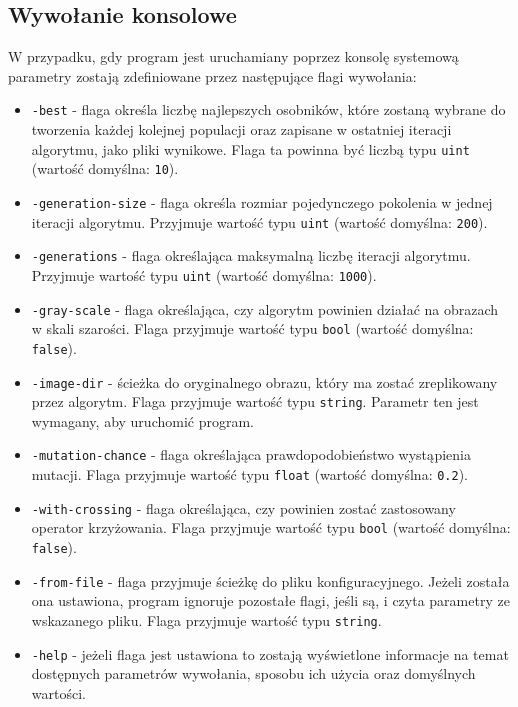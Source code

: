 \subsection{Wywołanie konsolowe}
W przypadku, gdy program jest uruchamiany poprzez konsolę systemową parametry zostają zdefiniowane przez następujące flagi wywołania:
\begin{itemize}
    \item \texttt{-best} - flaga określa liczbę najlepszych osobników, które zostaną wybrane do tworzenia każdej kolejnej populacji oraz zapisane w ostatniej iteracji algorytmu, jako pliki wynikowe. Flaga ta powinna być liczbą typu \texttt{uint} (wartość domyślna: \texttt{10}).
    \item \texttt{-generation-size} - flaga określa rozmiar pojedynczego pokolenia w jednej iteracji algorytmu. Przyjmuje wartość typu \texttt{uint} (wartość domyślna: \texttt{200}).
    \item \texttt{-generations} - flaga określająca maksymalną liczbę iteracji algorytmu. Przyjmuje wartość typu \texttt{uint} (wartość domyślna: \texttt{1000}).
    \item \texttt{-gray-scale} - flaga określająca, czy algorytm powinien działać na obrazach w skali szarości. Flaga przyjmuje wartość typu \texttt{bool} (wartość domyślna: \texttt{false}).
    \item \texttt{-image-dir} - ścieżka do oryginalnego obrazu, który ma zostać zreplikowany przez algorytm. Flaga przyjmuje wartość typu \texttt{string}. Parametr ten jest wymagany, aby uruchomić program.
    \item \texttt{-mutation-chance} - flaga określająca prawdopodobieństwo wystąpienia mutacji. Flaga przyjmuje wartość typu \texttt{float} (wartość domyślna: \texttt{0.2}).
    \item \texttt{-with-crossing} - flaga określająca, czy powinien zostać zastosowany operator krzyżowania. Flaga przyjmuje wartość typu \texttt{bool} (wartość domyślna: \texttt{false}).
    \item \texttt{-from-file} - flaga przyjmuje ścieżkę do pliku konfiguracyjnego. Jeżeli została ona ustawiona, program ignoruje pozostałe flagi, jeśli są, i czyta parametry ze wskazanego pliku. Flaga przyjmuje wartość typu \texttt{string}.
    \item \texttt{-help} - jeżeli flaga jest ustawiona to zostają wyświetlone informacje na temat dostępnych parametrów wywołania, sposobu ich użycia oraz domyślnych wartości.
\end{itemize}

